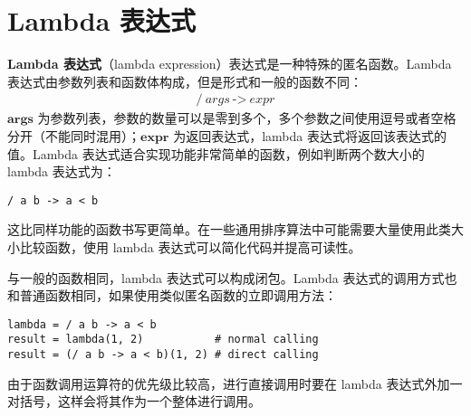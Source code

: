 \section{Lambda 表达式}

\textbf{Lambda 表达式}（lambda expression）表达式是一种特殊的匿名函数。Lambda 表达式由参数列表和函数体构成，但是形式和一般的函数不同：\vspace{-0.5em}
\begin{gather*}
    \texttt{/}\ args\ \texttt{->}\ expr
\end{gather*}
$\bm{args}$ 为参数列表，参数的数量可以是零到多个，多个参数之间使用逗号或者空格分开（不能同时混用）；$\bm{expr}$ 为返回表达式，lambda 表达式将返回该表达式的值。Lambda 表达式适合实现功能非常简单的函数，例如判断两个数大小的 lambda 表达式为：
\begin{lstlisting}[language=berry, numbers=none]
/ a b -> a < b
\end{lstlisting}
这比同样功能的函数书写更简单。在一些通用排序算法中可能需要大量使用此类大小比较函数，使用 lambda 表达式可以简化代码并提高可读性。

与一般的函数相同，lambda 表达式可以构成闭包。Lambda 表达式的调用方式也和普通函数相同，如果使用类似匿名函数的立即调用方法：
\begin{lstlisting}[language=berry, numbers=none]
lambda = / a b -> a < b
result = lambda(1, 2)           # normal calling
result = (/ a b -> a < b)(1, 2) # direct calling
\end{lstlisting}
由于函数调用运算符的优先级比较高，进行直接调用时要在 lambda 表达式外加一对括号，这样会将其作为一个整体进行调用。
